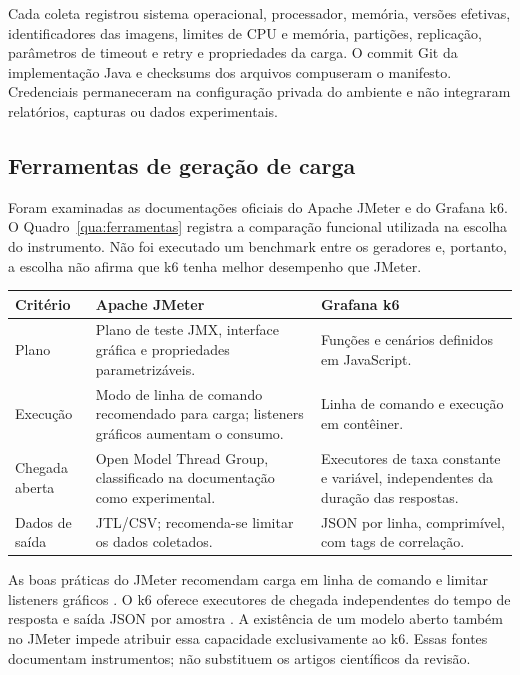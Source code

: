 Cada coleta registrou sistema operacional, processador, memória, versões efetivas, identificadores das imagens, limites de CPU e memória, partições, replicação, parâmetros de timeout e retry e propriedades da carga. O commit Git da implementação Java e checksums dos arquivos compuseram o manifesto. Credenciais permaneceram na configuração privada do ambiente e não integraram relatórios, capturas ou dados experimentais.

\subsection{Ferramentas de geração de carga}
Foram examinadas as documentações oficiais do Apache JMeter e do Grafana k6. O Quadro~\ref{qua:ferramentas} registra a comparação funcional utilizada na escolha do instrumento. Não foi executado um benchmark entre os geradores e, portanto, a escolha não afirma que k6 tenha melhor desempenho que JMeter.

\begin{quadro}[htbp]
\centering
\caption{Comparação dos instrumentos de geração de carga}
\label{qua:ferramentas}
\small
\begin{tabular}{|p{}|p{}|p{}|}
\hline
\textbf{Critério} & \textbf{Apache JMeter} & \textbf{Grafana k6} \\ \hline
Plano & Plano de teste JMX, interface gráfica e propriedades parametrizáveis. & Funções e cenários definidos em JavaScript. \\ \hline
Execução & Modo de linha de comando recomendado para carga; listeners gráficos aumentam o consumo. & Linha de comando e execução em contêiner. \\ \hline
Chegada aberta & Open Model Thread Group, classificado na documentação como experimental. & Executores de taxa constante e variável, independentes da duração das respostas. \\ \hline
Dados de saída & JTL/CSV; recomenda-se limitar os dados coletados. & JSON por linha, comprimível, com tags de correlação. \\ \hline
\end{tabular}
\end{quadro}

As boas práticas do JMeter recomendam carga em linha de comando e limitar listeners gráficos \cite{jmeterdocs}. O k6 oferece executores de chegada independentes do tempo de resposta e saída JSON por amostra \cite{k6docs,k6json}. A existência de um modelo aberto também no JMeter impede atribuir essa capacidade exclusivamente ao k6. Essas fontes documentam instrumentos; não substituem os artigos científicos da revisão.

